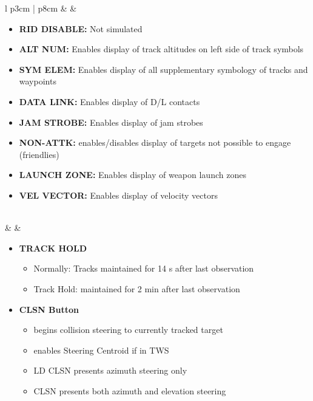 \documentclass[10pt,usenames,dvipsnames,twoside]{report}
\begin{document}
\begin{center}
\begin{longtable}{l p{3cm} | p{8cm}}
			\midrule
			\textbullet &    &
			\begin{minipage}[t]{\linewidth}
				\vspace{-7pt}
				\begin{itemize}
					\item \textbf{RID DISABLE:} Not simulated
					\item \textbf{ALT NUM:} Enables display of track altitudes on left side of track symbols
					\item \textbf{SYM ELEM:} Enables display of all supplementary symbology of tracks and waypoints
					\item \textbf{DATA LINK:} Enables display of D/L contacts
					\item \textbf{JAM STROBE:} Enables display of jam strobes
					\item \textbf{NON-ATTK:} enables/disables display of targets not possible to engage (friendlies)
					\item \textbf{LAUNCH ZONE:} Enables display of weapon launch zones
					\item \textbf{VEL VECTOR:} Enables display of velocity vectors
				\end{itemize}
			\end{minipage} \\
			\midrule
			\textbullet &    &
			\begin{minipage}[t]{\linewidth}
				\vspace{-7pt}
				\begin{itemize}
					\item \textbf{TRACK HOLD}
					\begin{itemize}
						\item Normally: Tracks maintained for 14 s after last observation
						\item Track Hold: maintained for 2 min after last observation
					\end{itemize}
					\item \textbf{CLSN Button}
					\begin{itemize}
						\item begins collision steering to currently tracked target
						\item enables Steering Centroid if in TWS
						\item LD CLSN presents azimuth steering only
						\item CLSN presents both azimuth and elevation steering
					\end{itemize}

\end{itemize}
\end{minipage}
\end{longtable}
\end{center}
\end{document}
